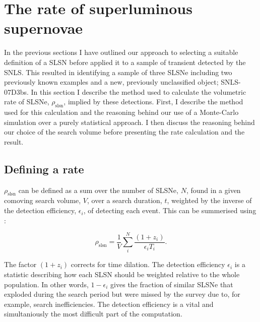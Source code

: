 \section{The rate of superluminous supernovae}
\label{sec:MC}
In the previous sections I have outlined our approach to selecting a suitable definition of a SLSN before applied it to a sample of transient detected by the SNLS. This resulted in identifying a sample of three SLSNe including two previously known examples and a new, previously unclassified object; SNLS-07D3bs. In this section I describe the method used to calculate the volumetric rate of SLSNe, $\rho_{\mathrm{slsn}}$, implied by these detections. First, I describe the method used for this calculation and the reasoning behind our use of a Monte-Carlo simulation over a purely statistical approach. I then discuss the reasoning behind our choice of the search volume before presenting the rate calculation and the result.

\subsection{Defining a rate}
\label{sec:method}
$\rho_{\mathrm{slsn}}$ can be defined as a sum over the number of SLSNe, $N$, found in a given comoving search volume, $V$, over a search duration, $t$, weighted by the inverse of the detection efficiency, $\epsilon_{i}$, of detecting each event. This can be summerised using :

\begin{equation}
\label{eq:rate}
\rho_{\mathrm{slsn}} = \frac{1}{V}\sum^{N}_{i}\frac{(1+z_i)}{\epsilon_{i}T_{i}}.
\end{equation}

The factor $(1+z_i)$ corrects for time dilation. The detection efficiency $\epsilon_i$ is a statistic describing how each SLSN should be weighted relative to the whole population. In other words, $1-\epsilon_i$ gives the fraction of similar SLSNe that exploded during the search period but were missed by the survey due to, for example, search inefficiencies. The detection efficiency is a vital and simultaniously the most difficult part of the computation.

